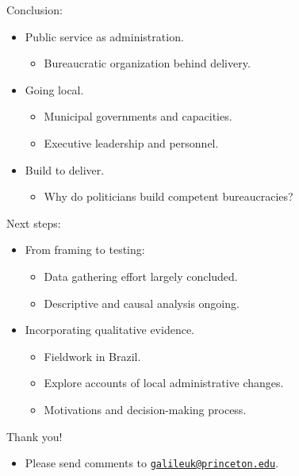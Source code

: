 \documentclass[ignorenonframetext,]{beamer}
\providecommand{\tightlist}{%
  \setlength{\itemsep}{0pt}\setlength{\parskip}{0pt}}
\begin{document}
\begin{frame}{Conclusion:}

\begin{itemize}[<+->]
\tightlist
\item
  Public service as administration.

  \begin{itemize}[<+->]
  \tightlist
  \item
    Bureaucratic organization behind delivery.
  \end{itemize}
\item
  Going local.

  \begin{itemize}[<+->]
  \tightlist
  \item
    Municipal governments and capacities.
  \item
    Executive leadership and personnel.
  \end{itemize}
\item
  Build to deliver.

  \begin{itemize}[<+->]
  \tightlist
  \item
    Why do politicians build competent bureaucracies?
  \end{itemize}
\end{itemize}

\end{frame}

\begin{frame}{Next steps:}

\begin{itemize}[<+->]
\tightlist
\item
  From framing to testing:

  \begin{itemize}[<+->]
  \tightlist
  \item
    Data gathering effort largely concluded.
  \item
    Descriptive and causal analysis ongoing.
  \end{itemize}
\item
  Incorporating qualitative evidence.

  \begin{itemize}[<+->]
  \tightlist
  \item
    Fieldwork in Brazil.
  \item
    Explore accounts of local administrative changes.
  \item
    Motivations and decision-making process.
  \end{itemize}
\end{itemize}

\end{frame}

\begin{frame}{Thank you!}

\begin{itemize}[<+->]
\tightlist
\item
  Please send comments to
  \selectfont \href{mailto:galileuk@princeton.edu}{\nolinkurl{galileuk@princeton.edu}}.
\end{itemize}

\end{frame}
\end{document}
